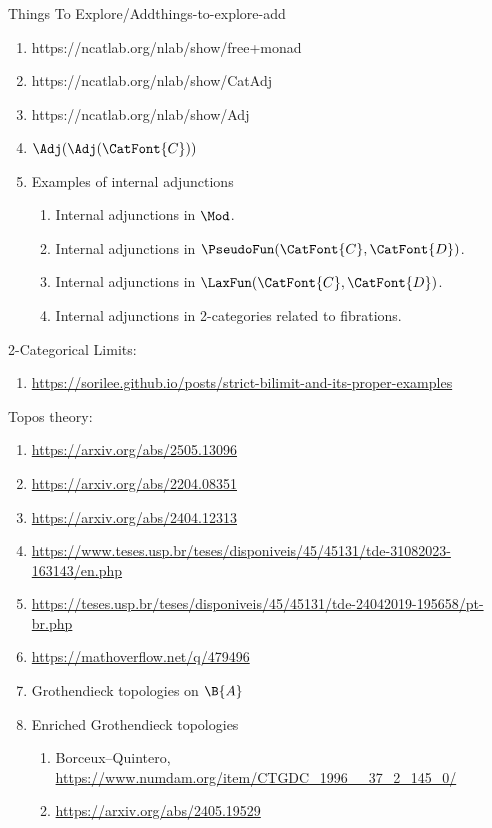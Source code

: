 \begin{remark}{Things To Explore/Add}{things-to-explore-add}
\begin{enumerate}
        \item https://ncatlab.org/nlab/show/free+monad
        \item https://ncatlab.org/nlab/show/CatAdj
        \item https://ncatlab.org/nlab/show/Adj
        \item $\Adj(\Adj(\CatFont{C}))$
        \item Examples of internal adjunctions
            \begin{enumerate}
                \item Internal adjunctions in $\Mod$.
                \item Internal adjunctions in $\PseudoFun(\CatFont{C},\CatFont{D})$.
                \item Internal adjunctions in $\LaxFun(\CatFont{C},\CatFont{D})$.
                \item Internal adjunctions in 2-categories related to fibrations.
            \end{enumerate}
    \end{enumerate}
    2-Categorical Limits:
    \begin{enumerate}
        \item \url{https://sorilee.github.io/posts/strict-bilimit-and-its-proper-examples}
    \end{enumerate}
    Topos theory:
    \begin{enumerate}
        \item \url{https://arxiv.org/abs/2505.13096}
        \item \url{https://arxiv.org/abs/2204.08351}
        \item \url{https://arxiv.org/abs/2404.12313}
        \item \url{https://www.teses.usp.br/teses/disponiveis/45/45131/tde-31082023-163143/en.php}
        \item \url{https://teses.usp.br/teses/disponiveis/45/45131/tde-24042019-195658/pt-br.php}
        \item \url{https://mathoverflow.net/q/479496}
        \item Grothendieck topologies on $\B{A}$
        \item Enriched Grothendieck topologies
            \begin{enumerate}
                \item Borceux--Quintero, \url{https://www.numdam.org/item/CTGDC_1996__37_2_145_0/}
                \item \url{https://arxiv.org/abs/2405.19529}
            \end{enumerate}

\end{enumerate}
\end{remark}
